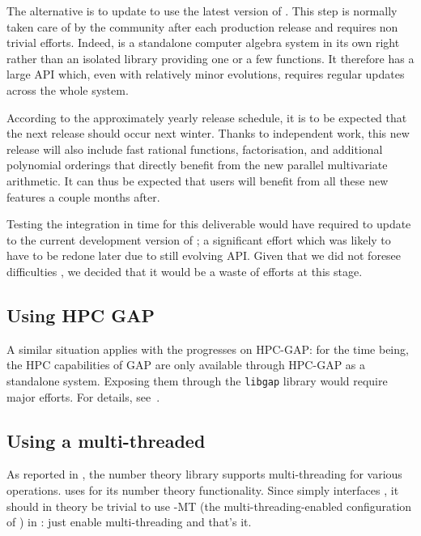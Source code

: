 \documentclass{deliverablereport}
\begin{document}
The alternative is to update \Sage to use the latest version of
\Singular. This step is normally taken care of by the community after
each production release \Singular and requires non trivial efforts.
Indeed, \Singular is a standalone computer algebra system in its own
right rather than an isolated library providing one or a few
functions. It therefore has a large API which, even with relatively
minor evolutions, requires regular updates across the whole \Sage
system.

According to the approximately yearly \Singular release schedule, it
is to be expected that the next release should occur next winter.
Thanks to independent work, this new release will also include fast
rational functions, factorisation, and additional polynomial orderings
that directly benefit from the new parallel multivariate arithmetic.
It can thus be expected that \Sage users will benefit from all these
new features a couple months after.

Testing the integration in time for this deliverable would have
required to update \Sage to the current development version of
\Singular; a significant effort which was likely to have to be redone
later due to still evolving API. Given that we did not foresee
difficulties , we decided that it
would be a waste of efforts at this stage.

\subsection{Using HPC GAP}

A similar situation applies with the progresses on HPC-GAP: for the
time being, the HPC capabilities of GAP are only available through
HPC-GAP as a standalone system. Exposing them through the
\texttt{libgap} library would require major efforts. For details,
see~.

\subsection{Using a multi-threaded \Pari}

As reported in , the number theory library \Pari supports
multi-threading for various operations.
\Sage uses \Pari for its number theory functionality.
Since \Sage simply interfaces \Pari, it should in theory
be trivial to use \Pari-MT (the multi-threading-enabled configuration of \Pari) in \Sage:
just enable multi-threading and that's it.
\end{document}
